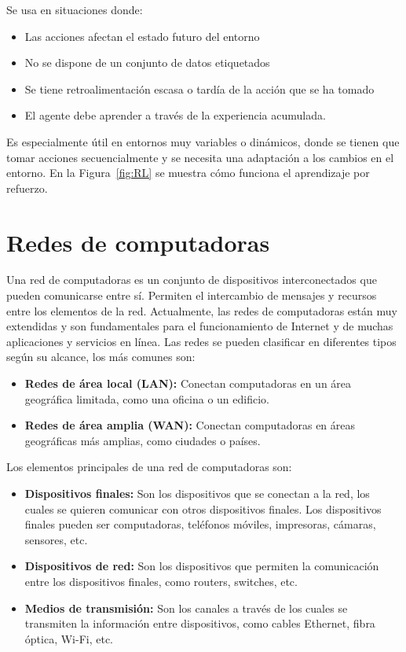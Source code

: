 Se usa en situaciones donde:
\begin{itemize}
	\item Las acciones afectan el estado futuro del entorno
	\item No se dispone de un conjunto de datos etiquetados
	\item Se tiene retroalimentación escasa o tardía de la acción que se ha tomado
	\item El agente debe aprender a través de la experiencia acumulada.
\end{itemize}
Es especialmente útil en entornos muy variables o dinámicos, donde se tienen que tomar acciones secuencialmente y se necesita una adaptación a los cambios en el entorno. En la Figura~\ref{fig:RL} se muestra cómo funciona el aprendizaje por refuerzo.



\section{Redes de computadoras}
Una red de computadoras es un conjunto de dispositivos interconectados que pueden comunicarse entre sí. Permiten el intercambio de mensajes y recursos entre los elementos de la red. Actualmente, las redes de computadoras están muy extendidas y son fundamentales para el funcionamiento de Internet y de muchas aplicaciones y servicios en línea.
Las redes se pueden clasificar en diferentes tipos según su alcance, los más comunes son:
\begin{itemize}
	\item \textbf{Redes de área local (LAN):} Conectan computadoras en un área geográfica limitada, como una oficina o un edificio.
	\item \textbf{Redes de área amplia (WAN):} Conectan computadoras en áreas geográficas más amplias, como ciudades o países.
\end{itemize}

Los elementos principales de una red de computadoras son:
\begin{itemize}
	\item \textbf{Dispositivos finales:} Son los dispositivos que se conectan a la red, los cuales se quieren comunicar con otros dispositivos finales. Los dispositivos finales pueden ser computadoras, teléfonos móviles, impresoras, cámaras, sensores, etc.
	\item \textbf{Dispositivos de red:} Son los dispositivos que permiten la comunicación entre los dispositivos finales, como routers, switches, etc.
	\item \textbf{Medios de transmisión:} Son los canales a través de los cuales se transmiten la información entre dispositivos, como cables Ethernet, fibra óptica, Wi-Fi, etc.
\end{itemize}

